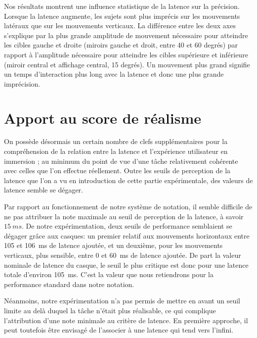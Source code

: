 	\par Nos résultats montrent une influence statistique de la latence sur la précision. Lorsque la latence augmente, les sujets sont plus imprécis sur les mouvements latéraux que sur les mouvements verticaux. La différence entre les deux axes s'explique par la plus grande amplitude de mouvement nécessaire pour atteindre les cibles gauche et droite (miroirs gauche et droit, entre 40 et 60 degrés) par rapport à l'amplitude nécessaire pour atteindre les cibles supérieure et inférieure (miroir central et affichage central, 15 degrés). Un mouvement plus grand signifie un temps d'interaction plus long avec la latence et donc une plus grande imprécision.
	
	\section{Apport au score de réalisme}
	\par On possède désormais un certain nombre de clefs supplémentaires pour la compréhension de la relation entre la latence et l'expérience utilisateur en immersion ; au minimum du point de vue d'une tâche relativement cohérente avec celles que l'on effectue réellement. Outre les seuils de perception de la latence que l'on a vu en introduction de cette partie expérimentale, des valeurs de latence semble se dégager.
	
	\par Par rapport au fonctionnement de notre système de notation, il semble difficile de ne pas attribuer la note maximale au seuil de perception de la latence, à savoir $15~ms$. De notre expérimentation, deux seuils de performance semblaient se dégager grâce aux casques: un premier relatif aux mouvements horizontaux entre 105 et 106~ms de latence ajoutée, et un deuxième, pour les mouvements verticaux, plus sensible, entre 0 et 60~ms de latence ajoutée. De part la valeur nominale de latence du casque, le seuil le plus critique est donc pour une latence totale d'environ 105~ms. C'est la valeur que nous retiendrons pour la performance standard dans notre notation.
	
	\par Néanmoins, notre expérimentation n'a pas permis de mettre en avant un seuil limite au delà duquel la tâche n'était plus réalisable, ce qui complique l'attribution d'une note minimale au critère de latence. En première approche, il peut toutefois être envisagé de l'associer à une latence qui tend vers l'infini.